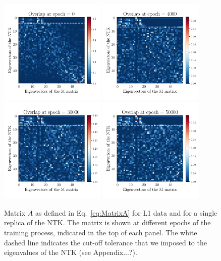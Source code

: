 \begin{figure}[h!]
  \centering
  \includegraphics[width=0.45\textwidth]{plots/overlap_epoch_0.pdf}
  \includegraphics[width=0.45\textwidth]{plots/overlap_epoch_4000.pdf} \\[-15pt]
  \includegraphics[width=0.45\textwidth]{plots/overlap_epoch_30000.pdf}
  \includegraphics[width=0.45\textwidth]{plots/overlap_epoch_50000.pdf}
  \vspace{0.5cm}
  \caption{Matrix $A$ as defined in Eq.~\eqref{eq:MatrixA} for L1 data and for a single
  replica of the NTK. The matrix is shown at different epochs of the training process,
  indicated in the top of each panel. The white dashed line indicates the cut-off
  tolerance that we imposed to the eigenvalues of the NTK (see Appendix...?).}
  \label{fig:NtkMAlign}
\end{figure}
